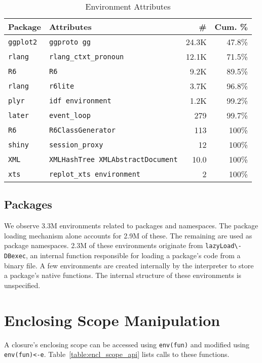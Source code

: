 \documentclass[sigplan,screen]{acmart}
\renewcommand{\c}[1]{\lstinline |#1|\xspace}
\begin{document}
\begin{table}[!h]
  \small
  \caption{Environment Attributes} \label{table:explicit_env_attr}
  \centering
  \begin{tabular}{@{}ll@{}rr@{}}
    \toprule
    \textbf{Package}&\textbf{Attributes}&\textbf{\#}&\textbf{Cum. \%}\\
    \midrule
    \texttt{ggplot2}&\texttt{ggproto gg}&24.3K&47.8\%\\
    \texttt{rlang}&\texttt{rlang\_ctxt\_pronoun}&12.1K&71.5\%\\
    \texttt{R6}&\texttt{R6}&9.2K&89.5\%\\
    \texttt{rlang}&\texttt{r6lite}&3.7K&96.8\%\\
    \texttt{plyr}&\texttt{idf environment}&1.2K&99.2\%\\
    \texttt{later}&\texttt{event\_loop}&279&99.7\%\\
    \texttt{R6}&\texttt{R6ClassGenerator}&113&100\%\\
    \texttt{shiny}&\texttt{session\_proxy}&12&100\%\\
    \texttt{XML}&\texttt{XMLHashTree XMLAbstractDocument}&10.0&100\%\\
    \texttt{xts}&\texttt{replot\_xts environment}&2&100\%\\
    \bottomrule
  \end{tabular}
\end{table}


\subsection{Packages}

We observe 3.3M environments related to packages and namespaces. The package
loading mechanism alone accounts for 2.9M of these. The remaining are used as
package namespaces. 2.3M of these environments originate from
\c{lazyLoad\-DBexec}, an internal function responsible for loading a package's
code from a binary file. A few environments are created internally by the
interpreter to store a package's native functions. The internal structure of
these environments is unspecified.

\section{Enclosing Scope Manipulation}

A closure's enclosing scope can be accessed using \c{env(fun)} and modified
using \c{env(fun)<-e}. Table~\ref{table:encl_scope_api} lists calls to these
functions.
\end{document}
